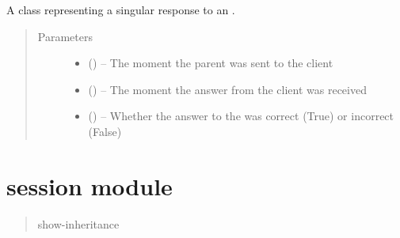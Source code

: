 \documentclass[letterpaper,10pt,english]{sphinxmanual}
\begin{document}
\begin{fulllineitems}
\label{\detokenize{response:response.Response}}
A class representing a singular response to an .
\begin{quote}\begin{description}
\item[{Parameters}] \leavevmode\begin{itemize}
\item {} 
 () -- The moment the parent  was sent to the client

\item {} 
 () -- The moment the answer from the client was received

\item {} 
 () -- Whether the answer to the  was correct (True) or incorrect (False)

\end{itemize}

\end{description}\end{quote}

\end{fulllineitems}



\chapter{session module}
\label{\detokenize{session:module-session}}\label{\detokenize{session::doc}}\label{\detokenize{session:session-module}}\begin{quote}\begin{description}
\item[{show-inheritance}] \leavevmode
\end{description}\end{quote}
\end{document}
